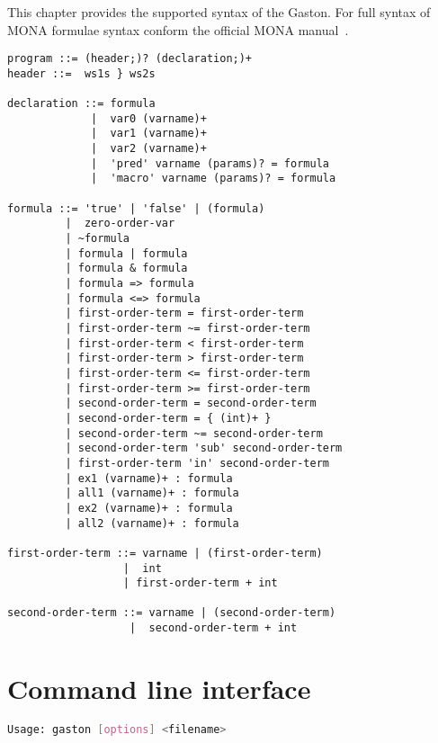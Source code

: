 This chapter provides the supported syntax of the Gaston. For full
syntax of MONA formulae syntax conform the official MONA manual~\cite{mona:manual}.

\begin{verbatim}
program ::= (header;)? (declaration;)+
header ::=  ws1s } ws2s

declaration ::= formula
             |  var0 (varname)+
             |  var1 (varname)+
             |  var2 (varname)+
             |  'pred' varname (params)? = formula
             |  'macro' varname (params)? = formula

formula ::= 'true' | 'false' | (formula)
         |  zero-order-var
         | ~formula
         | formula | formula
         | formula & formula
         | formula => formula
         | formula <=> formula
         | first-order-term = first-order-term 
         | first-order-term ~= first-order-term 
         | first-order-term < first-order-term 
         | first-order-term > first-order-term
         | first-order-term <= first-order-term 
         | first-order-term >= first-order-term
         | second-order-term = second-order-term
         | second-order-term = { (int)+ }
         | second-order-term ~= second-order-term
         | second-order-term 'sub' second-order-term
         | first-order-term 'in' second-order-term
         | ex1 (varname)+ : formula
         | all1 (varname)+ : formula
         | ex2 (varname)+ : formula
         | all2 (varname)+ : formula

first-order-term ::= varname | (first-order-term)
                  |  int
                  | first-order-term + int

second-order-term ::= varname | (second-order-term)
                   |  second-order-term + int
\end{verbatim}

\chapter{Command line interface}

\begin{lstlisting}[language=bash]
	Usage: gaston [options] <filename>
\end{lstlisting}

